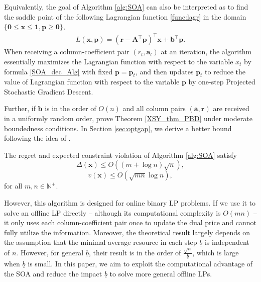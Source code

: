 \documentclass{article} %
\begin{document}
Equivalently, the goal of Algorithm \ref{alg:SOA} can also be interpreted as to find the saddle point of the following Lagrangian function \eqref{func:lagr} in the domain $\{\bm{0}\leq\bm{x}\leq\bm{1},\bm{p}\geq\bm{0}\}$,
\begin{align}
    \label{func:lagr}
    L(\bm{x},\bm{p})= \left(\bm{r}-\bm{A}^{\top}\bm{p}\right)^{\top}\bm{x} + \bm{b}^{\top}\bm{p}.
\end{align}
When receiving a column-coefficient pair $(r_t,\bm{a}_t)$ at an iteration, the algorithm essentially maximizes the Lagrangian function with respect to the variable $x_t$ by formula \eqref{SOA_dec_Alg} with fixed $\bm{p}=\bm{p}_t$, and then updates $\bm{p}_t$ to reduce the value of Lagrangian function with respect to the variable $\bm{p}$ by one-step Projected Stochastic Gradient Descent. 

Further, if $\bm{b}$ is in the order of $O(n)$ and all column pairs $(\bm{a},\bm{r})$ are received in a uniformly random order, \cite{li2020simple} prove Theorem \ref{XSY_thm_PBD} under moderate boundedness conditions. In Section \ref{sec:optgap}, we derive a better bound following the idea of \cite{balseiro2020dual}.

\begin{theorem}
The regret and expected constraint violation of Algorithm \ref{alg:SOA} satisfy
$$\Delta(\bm{x}) \le O\left((m+\log n)\sqrt{n}\right),$$
$$v(\bm{x}) \le O(\sqrt{mn}\log n),$$
for all $m, n \in \mathbb{N}^+$.
\label{XSY_thm_PBD}
\end{theorem}

However, this algorithm is designed for online binary LP problems. If we use it to solve an offline LP directly -- although its computational complexity is $O(mn)$ -- it only uses each column-coefficient pair once to update the dual price and cannot fully utilize the information. Moreover, the theoretical result largely depends on the assumption that the minimal average resource in each step $\underline{b}$ is independent of $n$. However, for general $\underline{b}$, their result is in the order of $\frac{\sqrt{n}}{\underline{b}}$, which is large when $\underline{b}$ is small. In this paper, we aim to exploit the computational advantage of the SOA and reduce the impact $\underline{b}$ to solve more general offline LPs.
\end{document}
